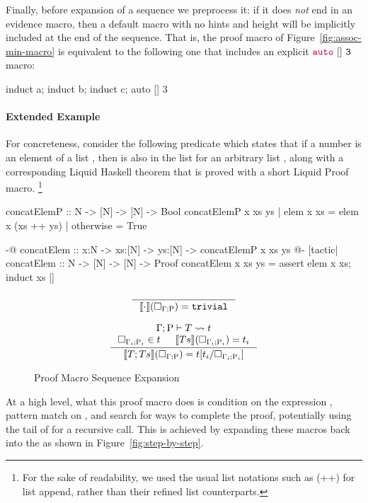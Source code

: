 Finally, before expansion of a sequence we preprocess it: if it does
{\em not} end in an evidence macro, then a default  macro
with no hints and height  will be implicitly included at the end
of the sequence. That is, the proof macro of
Figure~\ref{fig:assoc-min-macro} is equivalent to the following one
that includes an explicit ${\color{purple}\mathtt{auto}}~\mathtt{[]}~\mathtt{3}$ macro:
\begin{code}
  induct a; induct b; induct c; auto [] 3
\end{code}

\paragraph{Extended Example}

For concreteness, consider the following predicate which states that
if a number  is an element of a list , then  is
also in the list  for an arbitrary list , along
with a corresponding Liquid Haskell theorem that is proved with a short
Liquid Proof macro.
\footnote{For the sake of readability, we used the usual list
  notations such as (++) for list append, rather than their refined
  list counterparts.}%
%
\begin{code}
  concatElemP :: N -> [N] -> [N] -> Bool
  concatElemP x xs ys
    | elem x xs = elem x (xs ++ ys)
    | otherwise = True

  {-@ concatElem :: x:N -> xs:[N] -> ys:[N] ->
      {concatElemP x xs ys} @-}
  [tactic|
  concatElem :: N -> [N] -> [N] -> Proof
  concatElem x xs ys =
    assert {elem x xs};
    induct xs
  |]
\end{code}

\begin{figure}
  \[
  \begin{array}{c}
  \inference{}{\Sem{\cdot}{\macroHole{\Gamma}{\Rho}}{\MC{trivial}}}\\
\\    
  \inference
      { \Expand{\Gamma}{\Rho}{T}{t}\\
            \macroHole{\Gamma_i}{\Rho_i} \in t && 
            \Sem{Ts}{\macroHole{\Gamma_i}{\Rho_i}}{t_i}
          }
      { \Sem{T;Ts}{\macroHole{\Gamma}{\Rho}}{t[t_i/\macroHole{\Gamma_i}{\Rho_i}]}}
  \end{array}
  \]
  \caption{Proof Macro Sequence Expansion}
  \label{fig:sequence-semantics}
\end{figure}

At a high level, what this proof macro does is condition on the
expression , pattern match on , and search for
ways to complete the proof, potentially using the tail of  for
a recursive call. This is achieved by expanding these macros back into
the \LangB as shown in Figure~\ref{fig:step-by-step}.

